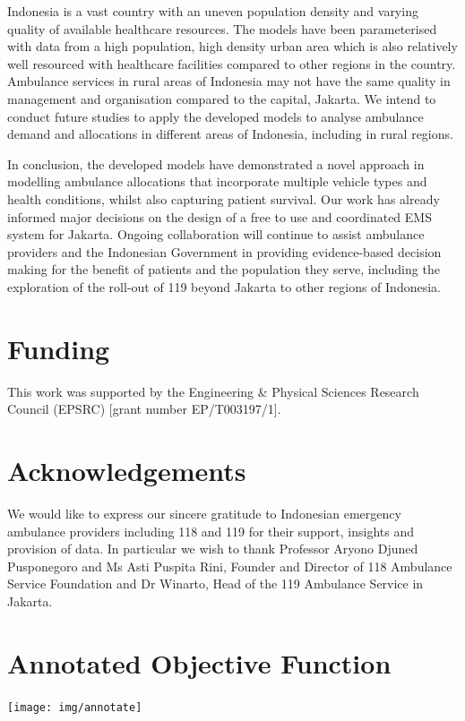 \documentclass[numbers,webpdf,imaman]{ima-authoring-template}%
\begin{document}
Indonesia is a vast country with an uneven population density and varying
quality of available healthcare resources. The models have been parameterised
with data from a high population, high density urban area which is also
relatively well resourced with healthcare facilities compared to other regions
in the country. Ambulance services in rural areas of Indonesia may not have
the same quality in management and organisation compared to the capital,
Jakarta. We intend to conduct future studies to apply the developed models to
analyse ambulance demand and allocations in different areas of Indonesia,
including in rural regions.

In conclusion, the developed models have demonstrated a novel approach in
modelling ambulance allocations that incorporate multiple vehicle types and
health conditions, whilst also capturing patient survival. Our work has
already informed major decisions on the design of a free to use and
coordinated EMS system for Jakarta. Ongoing collaboration will continue to
assist ambulance providers and the Indonesian Government in providing
evidence-based decision making for the benefit of patients and the population
they serve, including the exploration of the roll-out of 119 beyond Jakarta to
other regions of Indonesia. 


\section*{Funding}
This work was supported by the Engineering \& Physical Sciences Research Council
(EPSRC) [grant number EP/T003197/1].

\section*{Acknowledgements}
We would like to express our sincere gratitude to Indonesian emergency ambulance
providers including 118 and 119 for their support, insights and provision of
data. In particular we wish to thank Professor Aryono Djuned Pusponegoro and Ms
Asti Puspita Rini, Founder and Director of 118 Ambulance Service Foundation and
Dr Winarto, Head of the 119 Ambulance Service in Jakarta.


\newpage

\appendix

\section{Annotated Objective Function}\label{apx:annotated}
\texttt{[image: img/annotate]}
\end{document}
